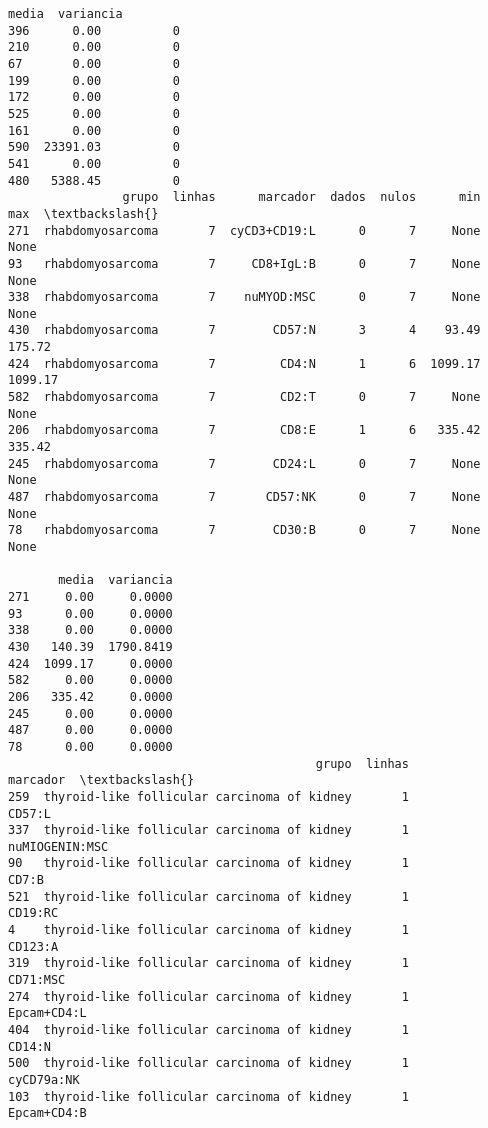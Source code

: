 \documentclass[11pt]{article}
\begin{document}
\begin{Verbatim}[commandchars=\\\{\}]
        media  variancia  
396      0.00          0  
210      0.00          0  
67       0.00          0  
199      0.00          0  
172      0.00          0  
525      0.00          0  
161      0.00          0  
590  23391.03          0  
541      0.00          0  
480   5388.45          0  
                grupo  linhas      marcador  dados  nulos      min      max  \textbackslash{}
271  rhabdomyosarcoma       7  cyCD3+CD19:L      0      7     None     None   
93   rhabdomyosarcoma       7     CD8+IgL:B      0      7     None     None   
338  rhabdomyosarcoma       7    nuMYOD:MSC      0      7     None     None   
430  rhabdomyosarcoma       7        CD57:N      3      4    93.49   175.72   
424  rhabdomyosarcoma       7         CD4:N      1      6  1099.17  1099.17   
582  rhabdomyosarcoma       7         CD2:T      0      7     None     None   
206  rhabdomyosarcoma       7         CD8:E      1      6   335.42   335.42   
245  rhabdomyosarcoma       7        CD24:L      0      7     None     None   
487  rhabdomyosarcoma       7       CD57:NK      0      7     None     None   
78   rhabdomyosarcoma       7        CD30:B      0      7     None     None   

       media  variancia  
271     0.00     0.0000  
93      0.00     0.0000  
338     0.00     0.0000  
430   140.39  1790.8419  
424  1099.17     0.0000  
582     0.00     0.0000  
206   335.42     0.0000  
245     0.00     0.0000  
487     0.00     0.0000  
78      0.00     0.0000  
                                           grupo  linhas        marcador  \textbackslash{}
259  thyroid-like follicular carcinoma of kidney       1          CD57:L   
337  thyroid-like follicular carcinoma of kidney       1  nuMIOGENIN:MSC   
90   thyroid-like follicular carcinoma of kidney       1           CD7:B   
521  thyroid-like follicular carcinoma of kidney       1         CD19:RC   
4    thyroid-like follicular carcinoma of kidney       1         CD123:A   
319  thyroid-like follicular carcinoma of kidney       1        CD71:MSC   
274  thyroid-like follicular carcinoma of kidney       1     Epcam+CD4:L   
404  thyroid-like follicular carcinoma of kidney       1          CD14:N   
500  thyroid-like follicular carcinoma of kidney       1      cyCD79a:NK   
103  thyroid-like follicular carcinoma of kidney       1     Epcam+CD4:B   


\end{Verbatim}
\end{document}
